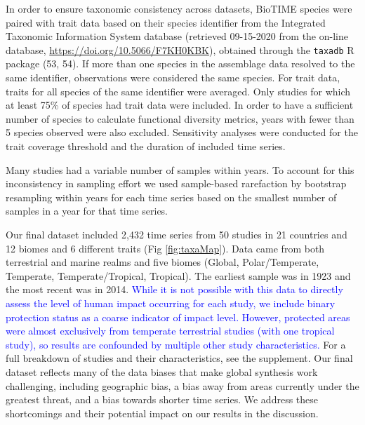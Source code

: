 \documentclass{article}
\begin{document}
In order to ensure taxonomic consistency across datasets, BioTIME
species were paired with trait data based on their species identifier
from the Integrated Taxonomic Information System database (retrieved
09-15-2020 from the on-line database,
\url{https://doi.org/10.5066/F7KH0KBK}), obtained through the
\texttt{taxadb} R package (53, 54). If more than one species in the
assemblage data resolved to the same identifier, observations were
considered the same species. For trait data, traits for all species of
the same identifier were averaged. Only studies for which at least 75\%
of species had trait data were included. In order to have a sufficient
number of species to calculate functional diversity metrics, years with
fewer than 5 species observed were also excluded. Sensitivity analyses
were conducted for the trait coverage threshold and the duration of
included time series.

Many studies had a variable number of samples within years. To account
for this inconsistency in sampling effort we used sample-based
rarefaction by bootstrap resampling within years for each time series
based on the smallest number of samples in a year for that time series.

Our final dataset included 2,432 time series from 50 studies in 21
countries and 12 biomes and 6 different traits (Fig \ref{fig:taxaMap}).
Data came from both terrestrial and marine realms and five biomes
(Global, Polar/Temperate, Temperate, Temperate/Tropical, Tropical). The
earliest sample was in 1923 and the most recent was in 2014.
\textcolor{blue}{While it is not possible with this data to directly assess the level of human impact occurring for each study, we include binary protection status as a coarse indicator of impact level. However, protected areas were almost exclusively from temperate terrestrial studies (with one tropical study), so results are confounded by multiple other study characteristics.}
For a full breakdown of studies and their characteristics, see the
supplement. Our final dataset reflects many of the data biases that make
global synthesis work challenging, including geographic bias, a bias
away from areas currently under the greatest threat, and a bias towards
shorter time series. We address these shortcomings and their potential
impact on our results in the discussion.
\end{document}

